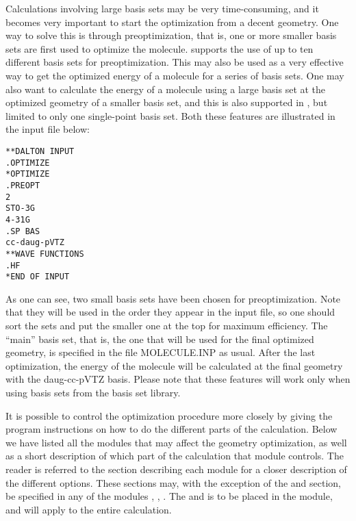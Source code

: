 Calculations involving large basis sets may be very time-consuming,
and it becomes very important to start the optimization from a decent
geometry. One way to solve this is through
preoptimization, that is,
one or more smaller basis sets are first used to optimize the
molecule.  supports the use of up to ten different
basis sets for preoptimization. This may also be used as a very
effective way to get the optimized energy of a molecule for a series
of basis sets. One may also want to calculate the energy of a molecule
using a large basis set at the optimized geometry of a smaller basis
set, and this is also supported in {\dalton}, but limited to only one
single-point basis set. Both these features are illustrated in the
input file below:

\begin{verbatim}
**DALTON INPUT
.OPTIMIZE
*OPTIMIZE
.PREOPT
2
STO-3G
4-31G
.SP BAS
cc-daug-pVTZ
**WAVE FUNCTIONS
.HF
*END OF INPUT
\end{verbatim}

As one can see, two small basis sets have been chosen for
preoptimization. Note that they will be
used in the order they appear in the input file, so one should
sort the sets and put the smaller one at the top for maximum
efficiency. The ``main'' basis set, that is, the one that will be
used for the final optimized geometry, is specified in the file
MOLECULE.INP as usual. After the last optimization, the energy of
the molecule will be calculated at the final geometry with the
daug-cc-pVTZ basis. Please note that these features will work only
when using basis sets from the basis set library.

It is possible to control the optimization procedure more closely
by giving the program instructions on how to do the different parts of
the calculation. Below we have listed all the modules that may
affect the geometry optimization, as well as a short description of
which part of the calculation that module controls. The reader is
referred to the section describing each module for a closer
description of the different options. These sections may, with the
exception of the  and  section, be specified
in any of the modules , ,
. The  and  is
to be placed in the  module, and will apply to the
entire calculation.

